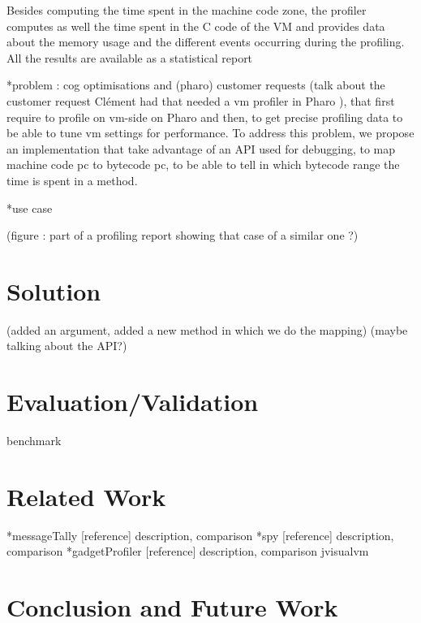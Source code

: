 \documentclass[10pt,reprint]{sigplanconf}
\newcommand{\seclabel}[1]{\label{sec:#1}}
\newcommand{\myparagraph}[1]{\vspace{0.1cm}\noindent \textbf{\textit{#1.}}}
\begin{document}
Besides computing the time spent in the machine code zone, the profiler computes as well the time spent in the C code of the VM and provides data about the memory usage and the different events occurring during the profiling. All the results are available as a statistical report 

	
*problem : cog optimisations and (pharo) customer requests (talk about the customer request Clément had that needed a vm profiler in Pharo ), that first require to profile on vm-side on Pharo and then, to get precise profiling data to be able to tune vm settings for performance. 
To address this problem, we propose an implementation that take advantage of an API used for debugging, to map machine code pc to bytecode pc, to be able to tell in which bytecode range the time is spent in a method.

*use case

(figure : part of a profiling report showing that case of a similar one ?)



\section{Solution}
(added an argument, added a new method in which we do the mapping)
(maybe talking about the API?)


\section{Evaluation/Validation}
benchmark

\section{Related Work}\seclabel{relatedWork}
*messageTally [reference]
description, comparison
*spy [reference]
description, comparison
*gadgetProfiler [reference]
description, comparison
jvisualvm

\section{Conclusion and Future Work}\seclabel{conclusion}




%


\end{document}
